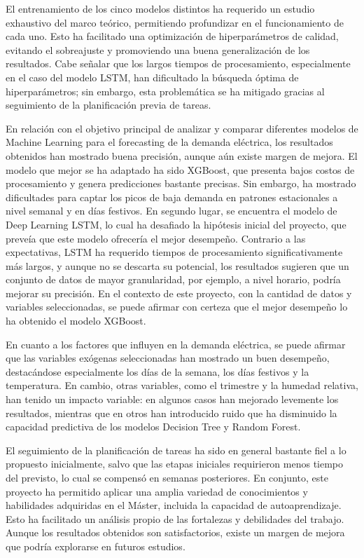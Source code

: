 \documentclass[12pt,a4paper]{report}
\begin{document}
El entrenamiento de los cinco modelos distintos ha requerido un estudio exhaustivo del marco teórico, permitiendo profundizar en el funcionamiento de cada uno. Esto ha facilitado una optimización de hiperparámetros de calidad, evitando el sobreajuste y promoviendo una buena generalización de los resultados. Cabe señalar que los largos tiempos de procesamiento, especialmente en el caso del modelo LSTM, han dificultado la búsqueda óptima de hiperparámetros; sin embargo, esta problemática se ha mitigado gracias al seguimiento de la planificación previa de tareas.

En relación con el objetivo principal de analizar y comparar diferentes modelos de Machine Learning para el forecasting de la demanda eléctrica, los resultados obtenidos han mostrado buena precisión, aunque aún existe margen de mejora. El modelo que mejor se ha adaptado ha sido XGBoost, que presenta bajos costos de procesamiento y genera predicciones bastante precisas. Sin embargo, ha mostrado dificultades para captar los picos de baja demanda en patrones estacionales a nivel semanal y en días festivos. En segundo lugar, se encuentra el modelo de Deep Learning LSTM, lo cual ha desafiado la hipótesis inicial del proyecto, que preveía que este modelo ofrecería el mejor desempeño. Contrario a las expectativas, LSTM ha requerido tiempos de procesamiento significativamente más largos, y aunque no se descarta su potencial, los resultados sugieren que un conjunto de datos de mayor granularidad, por ejemplo, a nivel horario, podría mejorar su precisión. En el contexto de este proyecto, con la cantidad de datos y variables seleccionadas, se puede afirmar con certeza que el mejor desempeño lo ha obtenido el modelo XGBoost.

En cuanto a los factores que influyen en la demanda eléctrica, se puede afirmar que las variables exógenas seleccionadas han mostrado un buen desempeño, destacándose especialmente los días de la semana, los días festivos y la temperatura. En cambio, otras variables, como el trimestre y la humedad relativa, han tenido un impacto variable: en algunos casos han mejorado levemente los resultados, mientras que en otros han introducido ruido que ha disminuido la capacidad predictiva de los modelos Decision Tree y Random Forest.

El seguimiento de la planificación de tareas ha sido en general bastante fiel a lo propuesto inicialmente, salvo que las etapas iniciales requirieron menos tiempo del previsto, lo cual se compensó en semanas posteriores. En conjunto, este proyecto ha permitido aplicar una amplia variedad de conocimientos y habilidades adquiridas en el Máster, incluida la capacidad de autoaprendizaje. Esto ha facilitado un análisis propio de las fortalezas y debilidades del trabajo. Aunque los resultados obtenidos son satisfactorios, existe un margen de mejora que podría explorarse en futuros estudios.
\end{document}
